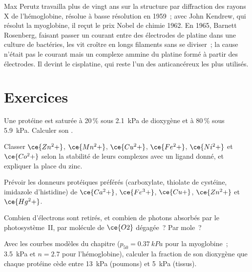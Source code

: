 \begin{history}
Max Perutz travailla plus de vingt ans sur la structure par diffraction des
rayons X de l'hémoglobine, résolue à basse résolution en 1959~; avec John
Kendrew, qui résolut la myoglobine, il reçut le prix Nobel de chimie 1962.
En 1965, Barnett Rosenberg, faisant passer un courant entre des électrodes
de platine dans une culture de bactéries, les vit croître en longs
filaments sans se diviser~; la cause n'était pas le courant mais un complexe
ammine du platine formé à partir des électrodes. Il devint le cisplatine,
qui reste l'un des anticancéreux les plus utilisés.
\end{history}

\section{Exercices}

\begin{exercise}[$\star$]\label{exo:b3:bioinorganic:1}
Une protéine est saturée à 20\,\% sous \qty{2.1}{kPa} de dioxygène et à
80\,\% sous \qty{5.9}{kPa}. Calculer son .
\end{exercise}

\begin{exercise}[$\star$]\label{exo:b3:bioinorganic:2}
Classer $\ce{Zn^2+}$, $\ce{Mn^2+}$, $\ce{Cu^2+}$, $\ce{Fe^2+}$, $\ce{Ni^2+}$ et $\ce{Co^2+}$ selon la stabilité de leurs complexes avec
un ligand donné, et expliquer la place du zinc.
\end{exercise}

\begin{exercise}[$\star$]\label{exo:b3:bioinorganic:3}
Prévoir les donneurs protéiques préférés (carboxylate, thiolate de
cystéine, imidazole d'histidine) de $\ce{Ca^2+}$, $\ce{Fe^3+}$, $\ce{Cu+}$, $\ce{Zn^2+}$ et $\ce{Hg^2+}$.
\end{exercise}

\begin{exercise}[$\star$]\label{exo:b3:bioinorganic:4}
Combien d'électrons sont retirés, et combien de photons absorbés par le photosystème~II,
par molécule de $\ce{O2}$ dégagée~? Par mole~?
\end{exercise}

\begin{exercise}[$\star\star$]\label{exo:b3:bioinorganic:5}
Avec les courbes modèles du chapitre ($p_{50} = \qty{0.37}{kPa}$ pour la myoglobine~; \qty{3.5}{kPa} et $n = 2.7$ pour
l'hémoglobine), calculer la fraction de son dioxygène que chaque protéine
cède entre \qty{13}{kPa} (poumons) et \qty{5}{kPa} (tissus).
\end{exercise}

